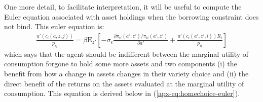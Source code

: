 \documentclass[12pt,pdftex]{article}
\begin{document}
\begin{onehalfspacing}
One more detail, to facilitate interpretation, it will be useful to compute the Euler equation associated with asset holdings when the borrowing constraint does not bind. This euler equation is:
\begin{align}
\frac{u'(c_{i}(a, z, j))}{p_{ij}} = \beta \mathrm{E}_{z'} \left[ -\sigma_{\epsilon} \frac{\partial \pi_{ii}(a',z') / \pi_{ii}(a',z')}{\partial a'} + \frac{u'(c_{i}(a', z', i))R_i}{p_{ii}} \right] \nonumber
\end{align}
which says that the agent should be indifferent between the marginal utility of consumption forgone to hold some more assets and two components (i) the benefit from how a change in assets changes in their variety choice and (ii) the direct benefit of the returns on the assets evaluated at the marginal utility of consumption. This equation is derived below in (\ref{apx-eq:homechoice-euler}).


\end{onehalfspacing}
\end{document}
